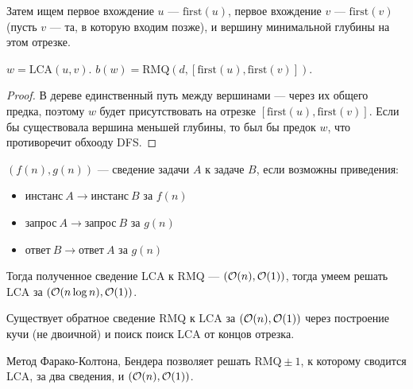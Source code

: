 Затем ищем первое вхождение $u$ --- $\text{first}(u)$,
первое вхождение $v$ --- $\text{first}(v)$
(пусть $v$ --- та, в которую входим позже),
и вершину минимальной глубины на этом отрезке.

\begin{statement}
    $w = \text{LCA}(u, v)$.
    $b(w) = \text{RMQ}(d, [\text{first}(u), \text{first}(v)])$.
\end{statement}
\begin{proof}
    В дереве единственный путь между вершинами --- через их общего предка,
    поэтому $w$ будет присутствовать на отрезке $[\text{first}(u), \text{first}(v)]$.
    Если бы существовала вершина меньшей глубины, то был бы предок $w$,
    что противоречит обхооду DFS.
\end{proof}

\begin{definition}[Сведение]
    $(f(n), g(n))$ --- сведение задачи $A$ к задаче $B$, если возможны приведения:
    \begin{itemize}
        \item $\text{инстанс}~A \to \text{инстанс}~B$ за $f(n)$
        \item $\text{запрос}~A \to \text{запрос}~B$ за $g(n)$
        \item $\text{ответ}~B \to \text{ответ}~A$ за $g(n)$
    \end{itemize}
\end{definition}

Тогда полученное сведение LCA к RMQ --- $(\mathcal{O}(n), \mathcal{O}(1))$,
тогда умеем решать LCA за $(\mathcal{O}(n \log n), \mathcal{O}(1))$.

Существует обратное сведение RMQ к LCA за $(\mathcal{O}(n), \mathcal{O}(1))$
через построение кучи (не двоичной)
и поиск поиск LCA от концов отрезка.

Метод Фарако-Колтона, Бендера позволяет решать $\text{RMQ}\pm 1$,
к которому сводится LCA, за два сведения, и $(\mathcal{O}(n), \mathcal{O}(1))$.
